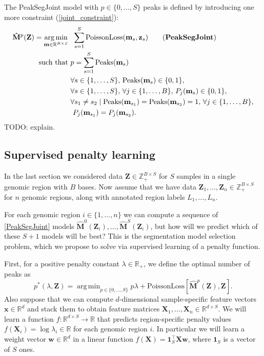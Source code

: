 \documentclass{article} %
\DeclareMathOperator*{\argmin}{arg\,min}
\DeclareMathOperator*{\Peaks}{Peaks}
\newcommand{\RR}{\mathbb R}
\newcommand{\ZZ}{\mathbb Z}
\begin{document}
The PeakSegJoint model with $p\in\{0, \dots, S\}$ peaks is defined by
introducing one more constraint (\ref{joint_constraint}):
\begin{align}
  \label{PeakSegJoint}
  \mathbf{\hat M}^p(\mathbf Z)  =
  \argmin_{\mathbf m\in\RR^{B\times S}} &\ \ 
  \sum_{s=1}^S 
  \text{PoissonLoss}(\mathbf m_s, \mathbf z_s) 
  \tag{\textbf{PeakSegJoint}}
  \\
  \text{such that} &\ p = \sum_{s=1}^S \Peaks(\mathbf m_s)
  \nonumber
  \\
  &\ \forall s\in\{1, \dots, S\},\, 
  \Peaks(\mathbf m_s)\in\{0, 1\},  
  \nonumber
  \\
  &\ \forall s\in\{1, \dots, S\},\,
  \forall j\in\{1, \dots, B\},\, P_j(\mathbf m_s) \in\{0, 1\},
  \nonumber
  \\
  &\ \forall s_1\neq s_2\mid
  \nonumber
  \Peaks(\mathbf m_{s_1})=\Peaks(\mathbf  m_{s_2})=1,\,
  \forall j\in\{1, \dots, B\},\\
  &\ \ P_j(\mathbf m_{s_1}) = P_j(\mathbf m_{s_2}).
  \label{joint_constraint}
\end{align}
TODO: explain.

\subsection{Supervised penalty learning}

In the last section we considered data $\mathbf Z\in\ZZ_+^{B\times S}$
for $S$ samples in a single genomic region with $B$ bases. Now assume
that we have data $\mathbf Z_1,\dots, \mathbf Z_n\in\ZZ_+^{B\times S}$
for $n$ genomic regions, along with annotated region labels
$L_1,\dots, L_n$. 

For each genomic region $i\in\{1,\dots,n\}$ we can compute a sequence
of \ref{PeakSegJoint} models $\mathbf{\hat M}^0(\mathbf Z_i),\dots,
\mathbf{\hat M}^S(\mathbf Z_i)$, but how will we predict which of
these $S+1$ models will be best?
This is the segmentation model selection problem, which we propose to
solve via supervised learning of a penalty function.

First, for a positive penalty constant $\lambda\in\RR_+$, we define
the optimal number of peaks as
\begin{equation}
  \label{eq:optimal_segments}
  p^*(\lambda, \mathbf Z) =
  \argmin_{p\in\{0, \dots, S\}}
  p \lambda + 
  \text{PoissonLoss}\left[
    \mathbf{\hat M}^p(\mathbf Z),
    \mathbf Z
  \right].
\end{equation}
Also suppose that we can compute $d$-dimensional sample-specific
feature vectors $\mathbf x\in\RR^d$ and stack them to obtain feature
matrices $\mathbf X_1,\dots, \mathbf X_n\in\RR^{d\times S}$. We will
learn a function $f:\RR^{d\times S}\rightarrow\RR$ that predicts
region-specific penalty values $f(\mathbf X_i) = \log \lambda_i\in\RR$
for each genomic region $i$. In particular we will learn a weight
vector $\mathbf w\in\RR^d$ in a linear function $f(\mathbf X) =
\mathbf 1_S^\intercal \mathbf X \mathbf w$, where $\mathbf 1_S$ is a
vector of $S$ ones.
\end{document}
